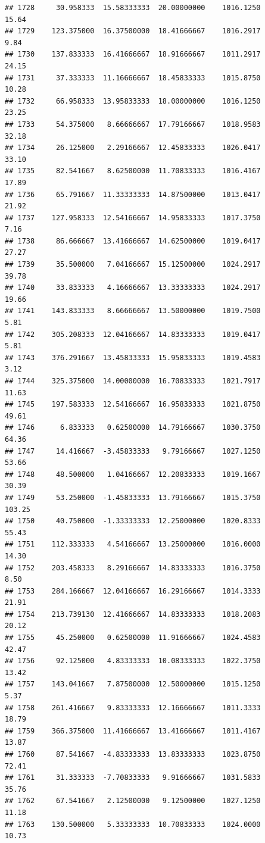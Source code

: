 \documentclass[
]{article}
\begin{document}
\begin{verbatim}
## 1728     30.958333  15.58333333  20.00000000    1016.1250       15.64
## 1729    123.375000  16.37500000  18.41666667    1016.2917        9.84
## 1730    137.833333  16.41666667  18.91666667    1011.2917       24.15
## 1731     37.333333  11.16666667  18.45833333    1015.8750       10.28
## 1732     66.958333  13.95833333  18.00000000    1016.1250       23.25
## 1733     54.375000   8.66666667  17.79166667    1018.9583       32.18
## 1734     26.125000   2.29166667  12.45833333    1026.0417       33.10
## 1735     82.541667   8.62500000  11.70833333    1016.4167       17.89
## 1736     65.791667  11.33333333  14.87500000    1013.0417       21.92
## 1737    127.958333  12.54166667  14.95833333    1017.3750        7.16
## 1738     86.666667  13.41666667  14.62500000    1019.0417       27.27
## 1739     35.500000   7.04166667  15.12500000    1024.2917       39.78
## 1740     33.833333   4.16666667  13.33333333    1024.2917       19.66
## 1741    143.833333   8.66666667  13.50000000    1019.7500        5.81
## 1742    305.208333  12.04166667  14.83333333    1019.0417        5.81
## 1743    376.291667  13.45833333  15.95833333    1019.4583        3.12
## 1744    325.375000  14.00000000  16.70833333    1021.7917       11.63
## 1745    197.583333  12.54166667  16.95833333    1021.8750       49.61
## 1746      6.833333   0.62500000  14.79166667    1030.3750       64.36
## 1747     14.416667  -3.45833333   9.79166667    1027.1250       53.66
## 1748     48.500000   1.04166667  12.20833333    1019.1667       30.39
## 1749     53.250000  -1.45833333  13.79166667    1015.3750      103.25
## 1750     40.750000  -1.33333333  12.25000000    1020.8333       55.43
## 1751    112.333333   4.54166667  13.25000000    1016.0000       14.30
## 1752    203.458333   8.29166667  14.83333333    1016.3750        8.50
## 1753    284.166667  12.04166667  16.29166667    1014.3333       21.91
## 1754    213.739130  12.41666667  14.83333333    1018.2083       20.12
## 1755     45.250000   0.62500000  11.91666667    1024.4583       42.47
## 1756     92.125000   4.83333333  10.08333333    1022.3750       13.42
## 1757    143.041667   7.87500000  12.50000000    1015.1250        5.37
## 1758    261.416667   9.83333333  12.16666667    1011.3333       18.79
## 1759    366.375000  11.41666667  13.41666667    1011.4167       13.87
## 1760     87.541667  -4.83333333  13.83333333    1023.8750       72.41
## 1761     31.333333  -7.70833333   9.91666667    1031.5833       35.76
## 1762     67.541667   2.12500000   9.12500000    1027.1250       11.18
## 1763    130.500000   5.33333333  10.70833333    1024.0000       10.73

\end{verbatim}
\end{document}
